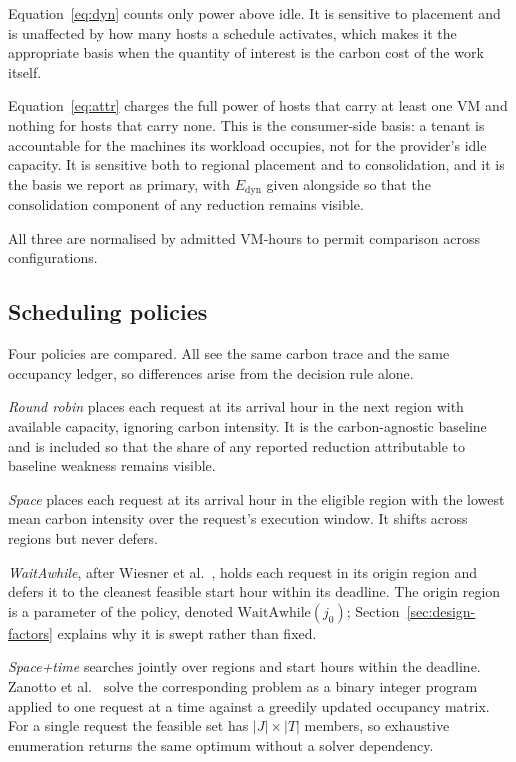 Equation~\eqref{eq:dyn} counts only power above idle. It is sensitive to
placement and is unaffected by how many hosts a schedule activates, which makes
it the appropriate basis when the quantity of interest is the carbon cost of
the work itself.

Equation~\eqref{eq:attr} charges the full power of hosts that carry at least one
VM and nothing for hosts that carry none. This is the consumer-side basis: a
tenant is accountable for the machines its workload occupies, not for the
provider's idle capacity. It is sensitive both to regional placement and to
consolidation, and it is the basis we report as primary, with
$E_{\mathrm{dyn}}$ given alongside so that the consolidation component of any
reduction remains visible.

All three are normalised by admitted VM-hours to permit comparison across
configurations.

\subsection{Scheduling policies}

Four policies are compared. All see the same carbon trace and the same
occupancy ledger, so differences arise from the decision rule alone.

\emph{Round robin} places each request at its arrival hour in the next region
with available capacity, ignoring carbon intensity. It is the carbon-agnostic
baseline and is included so that the share of any reported reduction
attributable to baseline weakness remains visible.

\emph{Space} places each request at its arrival hour in the eligible region
with the lowest mean carbon intensity over the request's execution window. It
shifts across regions but never defers.

\emph{WaitAwhile}, after Wiesner et al.~\cite{wiesner2021letswait}, holds each request in its origin
region and defers it to the cleanest feasible start hour within its deadline.
The origin region is a parameter of the policy, denoted
$\mathrm{WaitAwhile}(j_0)$; Section~\ref{sec:design-factors} explains why it is
swept rather than fixed.

\emph{Space+time} searches jointly over regions and start hours within the
deadline. Zanotto et al.~\cite{zanotto2025usercentric} solve the corresponding problem as a
binary integer program applied to one request at a time against a greedily updated occupancy
matrix. For a single request the feasible set has $|J| \times |T|$ members, so
exhaustive enumeration returns the same optimum without a solver dependency.

